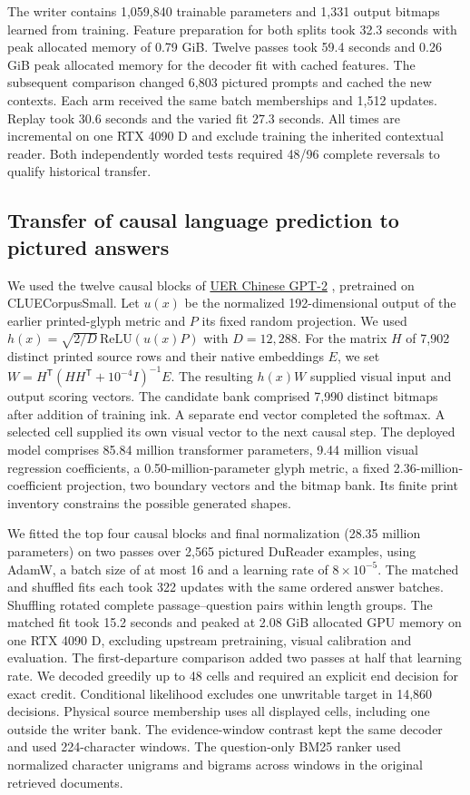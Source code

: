 \documentclass[12pt,a4paper]{article}
\providecommand{\DIFadd}[1]{{\protect\color{blue} \sf #1}} %
\begin{document}
\DIFadd{The writer contains 1,059,840 trainable parameters and 1,331 output bitmaps learned from training. Feature preparation for both splits took 32.3 seconds with peak allocated memory of 0.79 GiB. Twelve passes took 59.4 seconds and 0.26 GiB peak allocated memory for the decoder fit with cached features. The subsequent comparison changed 6,803 pictured prompts and cached the new contexts. Each arm received the same batch memberships and 1,512 updates. Replay took 30.6 seconds and the varied fit 27.3 seconds. All times are incremental on one RTX 4090 D and exclude training the inherited contextual reader. Both independently worded tests required 48/96 complete reversals to qualify historical transfer.
}

\subsection*{\DIFadd{Transfer of causal language prediction to pictured answers}}
\DIFadd{We used the twelve causal blocks of }\href{https://huggingface.co/uer/gpt2-chinese-cluecorpussmall}{\DIFadd{UER Chinese GPT-2}}\DIFadd{, pretrained on CLUECorpusSmall. Let $u(x)$ be the normalized 192-dimensional output of the earlier printed-glyph metric and $P$ its fixed random projection. We used $h(x)=\sqrt{2/D}\,\mathrm{ReLU}(u(x)P)$ with $D=12{,}288$. For the matrix $H$ of 7,902 distinct printed source rows and their native embeddings $E$, we set $W=H^{\mathsf T}(HH^{\mathsf T}+10^{-4}I)^{-1}E$. The resulting $h(x)W$ supplied visual input and output scoring vectors. The candidate bank comprised 7,990 distinct bitmaps after addition of training ink. A separate end vector completed the softmax. A selected cell supplied its own visual vector to the next causal step. The deployed model comprises 85.84 million transformer parameters, 9.44 million visual regression coefficients, a 0.50-million-parameter glyph metric, a fixed 2.36-million-coefficient projection, two boundary vectors and the bitmap bank. Its finite print inventory constrains the possible generated shapes.
}

\DIFadd{We fitted the top four causal blocks and final normalization (28.35 million parameters) on two passes over 2,565 pictured DuReader examples, using AdamW, a batch size of at most 16 and a learning rate of $8\times10^{-5}$. The matched and shuffled fits each took 322 updates with the same ordered answer batches. Shuffling rotated complete passage--question pairs within length groups. The matched fit took 15.2 seconds and peaked at 2.08 GiB allocated GPU memory on one RTX 4090 D, excluding upstream pretraining, visual calibration and evaluation. The first-departure comparison added two passes at half that learning rate. We decoded greedily up to 48 cells and required an explicit end decision for exact credit. Conditional likelihood excludes one unwritable target in 14,860 decisions. Physical source membership uses all displayed cells, including one outside the writer bank. The evidence-window contrast kept the same decoder and used 224-character windows. The question-only BM25 ranker used normalized character unigrams and bigrams across windows in the original retrieved documents.
}
\end{document}
